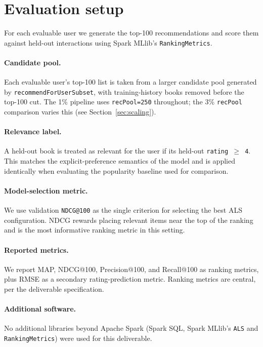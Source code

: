 \documentclass[10pt,twocolumn]{article}
\begin{document}
\section{Evaluation setup}
For each evaluable user we generate the top-100 recommendations and score them against held-out interactions using Spark MLlib's \texttt{RankingMetrics}.

\paragraph{Candidate pool.} Each evaluable user's top-100 list is taken from a larger candidate pool generated by \texttt{recommendForUserSubset}, with training-history books removed before the top-100 cut. The 1\% pipeline uses \texttt{recPool=250} throughout; the 3\% \texttt{recPool} comparison varies this (see Section~\ref{sec:scaling}).

\paragraph{Relevance label.} A held-out book is treated as relevant for the user if its held-out \texttt{rating $\geq$ 4}. This matches the explicit-preference semantics of the model and is applied identically when evaluating the popularity baseline used for comparison.

\paragraph{Model-selection metric.} We use validation \texttt{NDCG@100} as the single criterion for selecting the best ALS configuration. NDCG rewards placing relevant items near the top of the ranking and is the most informative ranking metric in this setting.

\paragraph{Reported metrics.} We report MAP, NDCG@100, Precision@100, and Recall@100 as ranking metrics, plus RMSE as a secondary rating-prediction metric. Ranking metrics are central, per the deliverable specification.

\paragraph{Additional software.} No additional libraries beyond Apache Spark (Spark SQL, Spark MLlib's \texttt{ALS} and \texttt{RankingMetrics}) were used for this deliverable.
\end{document}
